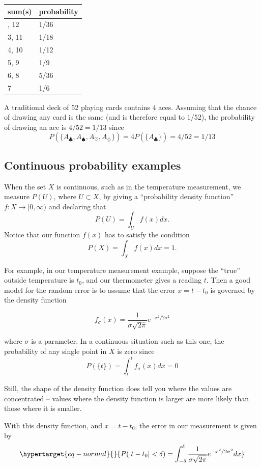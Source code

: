 \documentclass[
  11pt,
  letterpaper,
]{scrbook}
\theoremstyle{plain}
\theoremstyle{remark}
\begin{document}
\begin{longtable}[]{@{}ll@{}}
\toprule\noalign{}
sum(s) & probability \\
\midrule\noalign{}
\endhead
\bottomrule\noalign{}
\endlastfoot
2, 12 & 1/36 \\
3, 11 & 1/18 \\
4, 10 & 1/12 \\
5, 9 & 1/9 \\
6, 8 & 5/36 \\
7 & 1/6 \\
\end{longtable}

A traditional deck of \(52\) playing cards contains \(4\) aces. Assuming
that the chance of drawing any card is the same (and is therefore equal
to \(1/52\)), the probability of drawing an ace is \(4/52=1/13\) since
\[
P(\{A_{\clubsuit},A_{\spadesuit},A_{\heartsuit},A_{\diamondsuit}\}) = 4P(\{A_{\clubsuit}\})=4/52=1/13
\]

\hypertarget{continuous-probability-examples}{%
\subsection{Continuous probability
examples}\label{continuous-probability-examples}}

When the set \(X\) is continuous, such as in the temperature
measurement, we measure \(P(U)\), where \(U\subset X\), by giving a
``probability density function'' \(f:X\to [0,\infty)\) and declaring
that \[
P(U) = \int_{U}f(x) dx.
\] Notice that our function \(f(x)\) has to satisfy the condition \[
P(X)=\int_{X} f(x)dx = 1.
\]

For example, in our temperature measurement example, suppose the
``true'' outside temperature is \(t_0\), and our thermometer gives a
reading \(t\). Then a good model for the random error is to assume that
the error \(x=t-t_0\) is governed by the density function

\[
f_\sigma(x) = \frac{1}{\sigma\sqrt{2\pi}}e^{-x^2/2\sigma^2}
\]

where \(\sigma\) is a parameter. In a continuous situation such as this
one, the probability of any single point in \(X\) is zero since \[
P(\{t\})=\int_{t}^{t}f_{\sigma}(x)dx = 0
\]

Still, the shape of the density function does tell you where the values
are concentrated -- values where the density function is larger are more
likely than those where it is smaller.

With this density function, and \(x=t-t_0\), the error in our
measurement is given by
\begin{equation}\protect\hypertarget{eq-normal}{}{
P(|t-t_0|<\delta)=\int_{-\delta}^{\delta} \frac{1}{\sigma\sqrt{2\pi}}e^{-x^2/2\sigma^2} dx
}\label{eq-normal}\end{equation}
\end{document}
